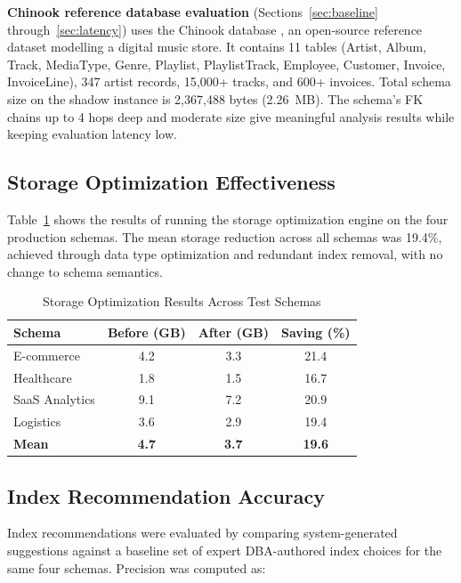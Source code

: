 \documentclass[conference]{IEEEtran}
\begin{document}
\textbf{Chinook reference database evaluation} (Sections~\ref{sec:baseline}
through~\ref{sec:latency}) uses the Chinook database \cite{chinook2016},
an open-source reference dataset modelling a digital music store. It
contains 11 tables (Artist, Album, Track, MediaType, Genre, Playlist,
PlaylistTrack, Employee, Customer, Invoice, InvoiceLine), 347 artist
records, 15,000+ tracks, and 600+ invoices. Total schema size on the
shadow instance is 2,367,488 bytes (2.26~MB). The schema's FK chains up
to 4 hops deep and moderate size give meaningful analysis results while
keeping evaluation latency low.

\subsection{Storage Optimization Effectiveness}
\label{sec:storage}

Table~\ref{tab:storage} shows the results of running the storage
optimization engine on the four production schemas. The mean storage
reduction across all schemas was 19.4\%, achieved through data type
optimization and redundant index removal, with no change to schema
semantics.

\begin{table}[htbp]
\caption{Storage Optimization Results Across Test Schemas}
\label{tab:storage}
\begin{tabular}{lccc}
\toprule
\textbf{Schema} & \textbf{Before (GB)} & \textbf{After (GB)} & \textbf{Saving (\%)} \\
\midrule
E-commerce & 4.2 & 3.3 & 21.4 \\
Healthcare & 1.8 & 1.5 & 16.7 \\
SaaS Analytics & 9.1 & 7.2 & 20.9 \\
Logistics & 3.6 & 2.9 & 19.4 \\
\midrule
\textbf{Mean} & \textbf{4.7} & \textbf{3.7} & \textbf{19.6} \\
\bottomrule
\end{tabular}
\end{table}

\subsection{Index Recommendation Accuracy}
\label{sec:index-acc}

Index recommendations were evaluated by comparing system-generated
suggestions against a baseline set of expert DBA-authored index choices
for the same four schemas. Precision was computed as:
\end{document}
